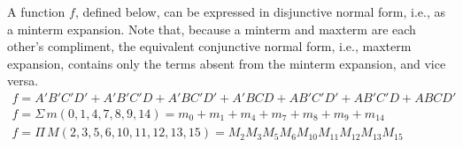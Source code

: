 \documentclass{article}
\begin{document}
    \smallskip\noindent
    A function $f$, defined below, can be expressed in disjunctive normal form, i.e., as a minterm expansion.
    Note that, because a minterm and maxterm are each other's compliment, the equivalent conjunctive normal form, i.e., maxterm expansion, contains only the terms absent from the minterm expansion, and vice versa.
    \begin{gather*}
        f= A'B'C'D' + A'B'C'D + A'BC'D' + A'BCD + AB'C'D' + AB'C'D + ABCD'      \\[.5em]
        f=\Sigma\,m(0,1,4,7,8,9,14) = m_0+m_1+m_4+m_7+m_8+m_9+m_{14}    \\[.5em]
        f=\Pi\,M(2,3,5,6,10,11,12,13,15)=M_2 M_3 M_5 M_6 M_{10}M_{11}M_{12}M_{13}M_{15}
    \end{gather*}
\end{document}
